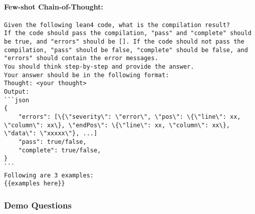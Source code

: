 \paragraph{Few-shot Chain-of-Thought:}

\begin{tcolorbox}[left=0mm,right=0mm,top=0mm,bottom=0mm,boxsep=1mm,arc=0mm,boxrule=0pt, frame empty, breakable]
    \small
    \begin{lstlisting}
Given the following lean4 code, what is the compilation result?
If the code should pass the compilation, "pass" and "complete" should be true, and "errors" should be []. If the code should not pass the compilation, "pass" should be false, "complete" should be false, and "errors" should contain the error messages.
You should think step-by-step and provide the answer.
Your answer should be in the following format:
Thought: <your thought>
Output:
```json
{
    "errors": [\{\"severity\": \"error\", \"pos\": \{\"line\": xx, \"column\": xx\}, \"endPos\": \{\"line\": xx, \"column\": xx\}, \"data\": \"xxxxx\"}, ...]
    "pass": true/false,
    "complete": true/false,
}
```
Following are 3 examples: 
{{examples here}}

\end{lstlisting}
\end{tcolorbox}





\subsubsection{Demo Questions}

